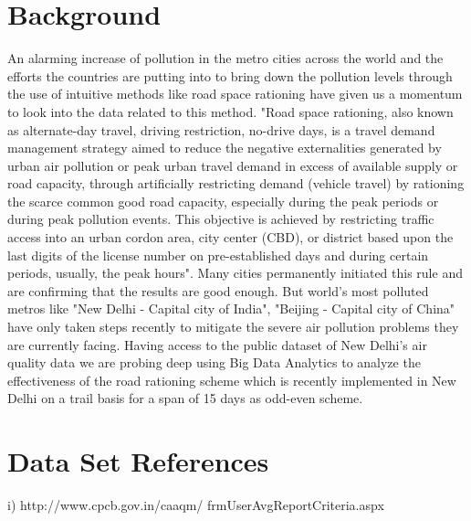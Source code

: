 \documentclass{acm_proc_article-sp}
\begin{document}
\section{Background}
An alarming increase of pollution in the metro cities across the world and the efforts the countries are putting into to bring down the pollution levels through the use of intuitive methods like road space rationing have given us a momentum to look into the data related to this method. "Road space rationing, also known as alternate-day travel, driving restriction, no-drive days,  is a travel demand management strategy aimed to reduce the negative externalities generated by urban air pollution or peak urban travel demand in excess of available supply or road capacity, through artificially restricting demand (vehicle travel) by rationing the scarce common good road capacity, especially during the peak periods or during peak pollution events. This objective is achieved by restricting traffic access into an urban cordon area, city center (CBD), or district based upon the last digits of the license number on pre-established days and during certain periods, usually, the peak hours". Many cities permanently initiated this rule and are confirming that the results are good enough. But world's most polluted metros like "New Delhi - Capital city of India", "Beijing - Capital city of China" have only taken steps recently to mitigate the severe air pollution problems they are currently facing. Having access to the public dataset of New Delhi's 
air quality data we are probing deep using Big Data Analytics to analyze the effectiveness of the road rationing scheme which is recently implemented in New Delhi on a trail basis for a span of 15 days as odd-even scheme. \cite{RoadSpaceRationing}



\section{Data Set References}

i)  http://www.cpcb.gov.in/caaqm/
frmUserAvgReportCriteria.aspx







\end{document}
